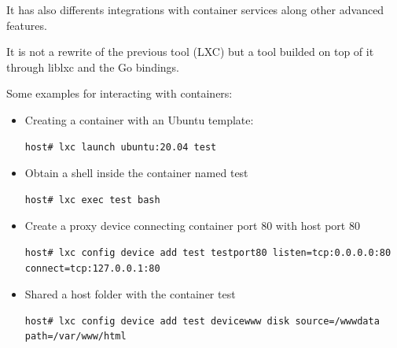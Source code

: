 It has also differents integrations with container services along other advanced features.

It is not a rewrite of the previous tool (LXC) but a tool builded on top of it through liblxc and the Go bindings.

Some examples for interacting with containers:

\begin{itemize}
	\item{Creating a container with an Ubuntu template}: 
	\begin{verbatim}
host# lxc launch ubuntu:20.04 test
	\end{verbatim}
	\item{Obtain a shell inside the container named test}
	\begin{verbatim}
host# lxc exec test bash 
	\end{verbatim}
	\item{Create a proxy device connecting container port 80 with host port 80}
	\begin{verbatim}
host# lxc config device add test testport80 listen=tcp:0.0.0.0:80 connect=tcp:127.0.0.1:80 
	\end{verbatim}
	\item{Shared a host folder with the container test}
	\begin{verbatim}
host# lxc config device add test devicewww disk source=/wwwdata path=/var/www/html 
	\end{verbatim}
\end{itemize}







